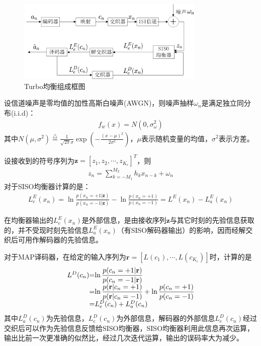 \begin{figure}[htb]
  \begin{center}
    \includegraphics[width=0.8\textwidth]{images/turbotheory.pdf}
  \end{center}
  \caption{Turbo均衡组成框图}
  \label{fig:2.4}
\end{figure}

设信道噪声是零均值的加性高斯白噪声(AWGN)，则噪声抽样$\omega_n$是满足独立同分布(i.i.d)：
\begin{eqnarray}
    f_w(x)=N(0,\sigma_{\omega}^2)
    \label{equ:2.32}
\end{eqnarray}
其中$N(\mu,\sigma^2)\stackrel{\triangle}{=}\frac{1}{\sqrt{2\pi}\sigma}\exp\left(-\frac{(x-\mu)^2}{2\sigma^2}\right)$，$\mu$表示随机变量的均值，$\sigma^2$表示方差。

设接收到的符号序列为$\mathbf{z}=[z_1,z_2,\cdots,z_{K_c}]^T$，则
\begin{eqnarray}
    z_n=\sum_{k=-M_1}^{M_2}h_kx_{n-k}+\omega_n
    \label{equ:2.32}
\end{eqnarray}
对于SISO均衡器计算的是：
\begin{eqnarray}
    L_e^E(x_n)=\ln\frac{p(x_n=+1|\mathbf{z})}{p(x_n=-1|\mathbf{z})}-\ln\frac{p(x_n=+1)}{p(x_n=-1)}=L^E(x_n)-L_a^E(x_n)
    \label{equ:2.33}
\end{eqnarray}

在均衡器输出的$L_e^E(x_n)$是外部信息，是由接收序列$\mathbf{z}$与其它时刻的先验信息获取的，并不受现时刻先验信息$L_a^E(x_n)$（有SISO解码器输出）的影响，因而经解交织后可用作解码器的先验信息。

对于MAP译码器，在给定的输入序列为$\mathbf{r}=[L(c_1),\cdots,L(c_{K_c})]$时，计算的是
\begin{eqnarray}
    \begin{array}{l@{\mbox{=}}l}
    L^D(c_n)&\ln\dfrac{p(c_n=+1|\mathbf{r})}{p(c_n=-1|\mathbf{r})}\\
    &\ln\dfrac{p(\mathbf{r}|c_n=+1)}{p(\mathbf{r}|c_n=-1)}+\ln\dfrac{p(c_n=+1)}{p(c_n=-1)}\\
    &L_e^D(c_n)+L_a^D(c_n)
    \end{array}
    \label{equ:2.34}
\end{eqnarray}
其中$L_a^D(c_n)$为先验信息，$L_e^D(c_n)$为外部信息，解码器的外部信息$L_e^D(c_n)$经过交织后可以作为先验信息反馈给SISO均衡器，SISO均衡器利用此信息再次运算，输出比前一次更准确的似然比，经过几次迭代运算，输出的误码率大为减少。

